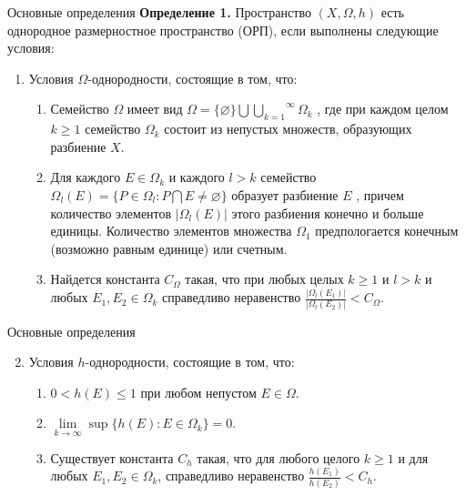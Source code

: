 \documentclass{beamer}
\begin{document}
% 
% 
% 
\begin{frame}{Основные определения}
    \textbf{Определение 1.} Пространство $(X, \Omega, h)$ есть
    однородное размерностное пространство (ОРП),
    если   выполнены следующие условия:
    \begin{enumerate}
        \item 
            Условия $\Omega$-однородности, состоящие в том, 
            что:
            \begin{enumerate}
                \item  
                     Семейство $\Omega$ имеет вид 
                     $\Omega = \{\varnothing\} {\bigcup }\overset{\infty}{\underset{k=1}{\bigcup}} \Omega_k$ ,
                     где при каждом целом $k \geq 1$ семейство $\Omega_k$
                     состоит из непустых множеств,
                     образующих разбиение $X$.
                \item
                    Для каждого $E \in \Omega_k$ и каждого $l > k$
                    семейство 
                    $\Omega_l(E) = \{P \in \Omega_l : P \bigcap E \neq \varnothing\}$
                    образует  разбиение $E$ ,
                    причем количество элементов $| \Omega_l (E) |$ 
                    этого разбиения конечно и больше единицы.
                    Количество элементов множества $\Omega_1$
                    предпологается конечным (возможно равным единице)
                    или счетным.
                \item
                    Найдется константа $C_\Omega$ такая,
                    что при любых целых $k \geq 1$ и $l > k$ и любых 
                    $E_1, E_2 \in \Omega_k$
                    справедливо неравенство
                    $\frac{|\Omega_l(E_1)|}{|\Omega_l(E_2)|} < C_\Omega $.
            \end{enumerate}
    \end{enumerate}
\end{frame}

% 
% 
% 
\begin{frame}{Основные определения}
    \begin{enumerate}
    \setcounter{enumi}{1}
        \item 
            Условия $h$-однородности, состоящие в том, что:
            \begin{enumerate}
                \item 
                    $0 < h(E) \leq 1$ при любом непустом
                    $E \in \Omega $.
                \item
                    $\underset{k \to \infty} {\lim}
                    \sup \{ h(E) : E \in \Omega_k \} = 0$.
                \item
                    Существует константа $C_h$ такая,
                    что для любого целого $k \geq 1$ и для любых 
                    $E_1 , E_2 \in \Omega_k$,
                    справедливо неравенство 
                    $ \frac{h(E_1)}{h(E_2)} < C_h $.
            \end{enumerate}
    \end{enumerate}
\end{frame}
\end{document}

